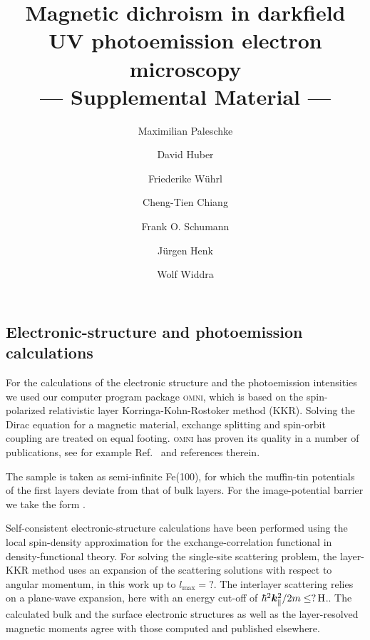 \documentclass[amsfonts, amssymb, amsmath, preprint, showkeys, twoside, prl, superscriptaddress, aps]{revtex4-2}
\renewcommand{\vec}[1]{\boldsymbol{#1}}
\begin{document}
\begin{sloppy}

\title{Magnetic dichroism in darkfield UV photoemission electron microscopy  \\ --- Supplemental Material ---}

\author{Maximilian Paleschke}
\author{David Huber}
\author{Friederike Wührl}

\author{Cheng-Tien Chiang}

\author{Frank O. Schumann}

\author{Jürgen Henk}
\author{Wolf Widdra}

\maketitle

\section{Electronic-structure and photoemission calculations}
For the calculations of the electronic structure and the photoemission intensities we used our computer program package \textsc{omni}, which is based on the spin-polarized relativistic layer Korringa-Kohn-Rostoker method (KKR). Solving the Dirac equation for a magnetic material, exchange splitting and spin-orbit coupling are treated on equal footing. \textsc{omni} has proven its quality in a number of publications, see for example Ref.~ and references therein.

The sample is taken as semi-infinite Fe(100), for which the muffin-tin potentials of the first  layers deviate from that of bulk layers.  For the image-potential barrier we take the  form .

Self-consistent electronic-structure calculations have been performed using the local spin-density approximation for the exchange-correlation functional in density-functional theory. For solving the single-site scattering problem, the layer-KKR method uses an expansion of the scattering solutions with respect to angular momentum, in this work up to $l_{\mathrm{max}} = ?$. The interlayer scattering relies on a  plane-wave expansion, here with an energy cut-off of $\hbar^{2}\vec{k}_{\parallel}^{2} / 2 m \leq \unit[?]{H}$.. The calculated bulk and the surface electronic structures as well as the layer-resolved magnetic moments agree with those computed and published elsewhere. 


\end{sloppy}
\end{document}
